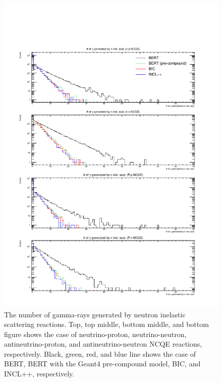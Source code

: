 \begin{figure}[h]
	\centering
	\includegraphics[width=16cm]{PDF/Secondary/Comparison_PreCompound/gamma/pdf1/Logy_NumSec}
	\caption[The number of gamma-rays generated by neutron inelastic scattering reactions]{
	The number of gamma-rays generated by neutron inelastic scattering reactions.
	Top, top middle, bottom middle, and bottom figure shows the case of neutrino-proton, neutrino-neutron, antineutrino-proton, and antineutrino-neutron NCQE reactions, respectively.
	Black, green, red, and blue line shows the case of BERT, BERT with the Geant4 pre-compound model, BIC, and INCL++, respectively.
	}\label{Others_gamma_Logy_NumSec}
\end{figure}

